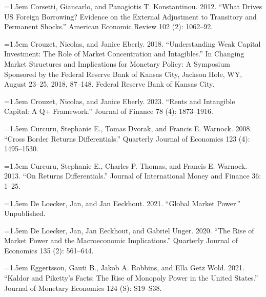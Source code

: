 \documentclass[11pt]{article}
\begin{document}
\noindent\hangindent=1.5em Corsetti, Giancarlo, and Panagiotis T. Konstantinou. 2012. “What Drives US Foreign Borrowing? Evidence on the External Adjustment to Transitory and Permanent Shocks.” American Economic Review 102 (2): 1062–92.\par

\noindent\hangindent=1.5em Crouzet, Nicolas, and Janice Eberly. 2018. “Understanding Weak Capital Investment: The Role of Market Concentration and Intagibles.” In Changing Market Structures and Implications for Monetary Policy: A Symposium Sponsored by the Federal Reserve Bank of Kansas City, Jackson Hole, WY, August 23–25, 2018, 87–148. Federal Reserve Bank of Kansas City.\par

\noindent\hangindent=1.5em Crouzet, Nicolas, and Janice Eberly. 2023. “Rents and Intangible Capital: A Q+ Framework.” Journal of Finance 78 (4): 1873–1916.\par

\noindent\hangindent=1.5em Curcuru, Stephanie E., Tomas Dvorak, and Francis E. Warnock. 2008. “Cross Border Returns Differentials.” Quarterly Journal of Economics 123 (4): 1495–1530.\par

\noindent\hangindent=1.5em Curcuru, Stephanie E., Charles P. Thomas, and Francis E. Warnock. 2013. “On Returns Differentials.” Journal of International Money and Finance 36: 1–25.\par

\noindent\hangindent=1.5em De Loecker, Jan, and Jan Eeckhout. 2021. “Global Market Power.” Unpublished.\par

\noindent\hangindent=1.5em De Loecker, Jan, Jan Eeckhout, and Gabriel Unger. 2020. “The Rise of Market Power and the Macroeconomic Implications.” Quarterly Journal of Economics 135 (2): 561–644.\par

\noindent\hangindent=1.5em Eggertsson, Gauti B., Jakob A. Robbins, and Ella Getz Wold. 2021. “Kaldor and Piketty’s Facts: The Rise of Monopoly Power in the United States.” Journal of Monetary Economics 124 (S): S19–S38.\par
\end{document}
